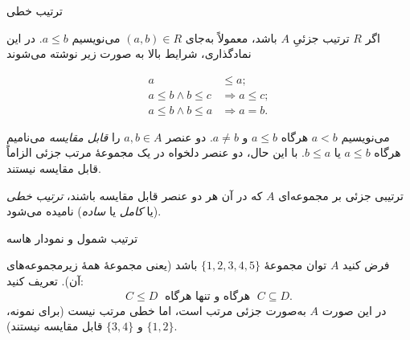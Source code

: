 \begin{frame}[t]{ترتیب خطی}

    اگر $R$ ترتیب جزئیِ $A$ باشد، معمولاً به‌جای $(a,b) \in R$ می‌نویسیم $a \le b$.
    در این نمادگذاری، شرایط  بالا به صورت زیر نوشته می‌شوند

    \[
        \begin{aligned}
            a                     & \le a;               \\
            a \le b \land b \le c & \Rightarrow a \le c; \\
            a \le b \land b \le a & \Rightarrow a = b.
        \end{aligned}
    \]

    می‌نویسیم $a < b$ هرگاه $a \le b$ و $a \ne b$.
    دو عنصر $a,b \in A$ را \textit{قابل مقایسه} می‌نامیم هرگاه $a \le b$ یا $b \le a$. با این حال، دو عنصر دلخواه در یک مجموعهٔ مرتب جزئی الزاماً قابل مقایسه نیستند.

    \begin{definition}
        ترتیبی جزئی بر مجموعه‌ای $A$ که در آن هر دو عنصر قابل مقایسه باشند، \textit{ترتیب خطی} (یا \textit{کامل} یا \textit{ساده}) نامیده می‌شود.
    \end{definition}
\end{frame}

\begin{frame}[t,fragile]{ترتیب شمول و نمودار هاسه}
    \begin{example}
        فرض کنید $A$ توان مجموعهٔ $\{1,2,3,4,5\}$ باشد (یعنی مجموعهٔ همهٔ زیرمجموعه‌های آن). تعریف کنید:
        \[
            C \le D \;\text{ هرگاه و تنها هرگاه }\; C \subseteq D.
        \]
        در این صورت $A$ به‌صورت جزئی مرتب است، اما خطی مرتب نیست (برای نمونه، $\{1,2\}$ و $\{3,4\}$ قابل مقایسه نیستند).
    \end{example}
\end{frame}

